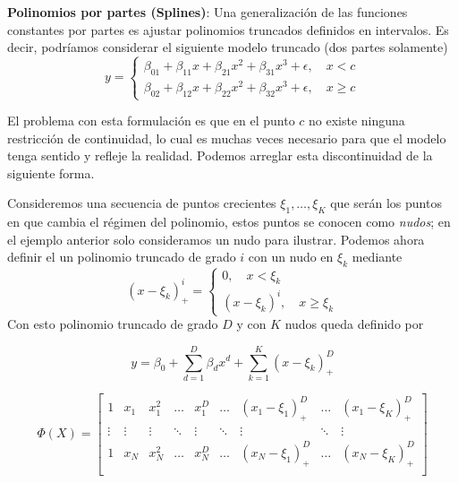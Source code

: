 \iffalse
\noindent\textbf{Polinomios por partes (Splines)}: Una generalización de las funciones constantes por partes es ajustar polinomios truncados definidos en intervalos. Es decir, podríamos considerar el siguiente modelo truncado (dos partes solamente) 
\begin{equation}
    y = \left\{\begin{matrix}
    \beta_{01}+\beta_{11}x+\beta_{21}x^2+\beta_{31}x^3+\epsilon,\quad x < c\\
    \beta_{02}+\beta_{12}x+\beta_{22}x^2+\beta_{32}x^3+\epsilon,\quad x \geq c
    \end{matrix}\right.
\end{equation}
    
El problema con esta formulación es que en el punto $c$ no existe ninguna restricción de continuidad, lo cual es muchas veces necesario para que el modelo tenga sentido y refleje la realidad. Podemos arreglar esta discontinuidad de la siguiente forma.

Consideremos una secuencia de puntos crecientes $\xi_1,\ldots,\xi_K$ que serán los puntos en que cambia el régimen del polinomio, estos puntos se conocen como \emph{nudos}; en el ejemplo anterior solo consideramos un nudo para ilustrar. Podemos ahora definir el un polinomio truncado de grado $i$ con un nudo en $\xi_k$ mediante
\begin{equation}
    (x-\xi_k)_+^i = \left\{\begin{matrix}
    0,\quad x < \xi_k\\
    (x-\xi_k)^i,\quad x \geq \xi_k
    \end{matrix}\right.
\end{equation}
Con esto polinomio truncado de grado $D$ y con $K$ nudos queda definido por
    
    \begin{equation}
        y = \beta_0 + \sum_{d=1}^D\beta_dx^d+\sum_{k=1}^K(x-\xi_k)_+^D
    \end{equation}
    
    \begin{equation}
        \Phi(X) = \left[ \begin{matrix} 1 & x_1 & x_1^2 & \ldots & x_1^D & \ldots & (x_1-\xi_1)_+^D & \ldots & (x_1-\xi_K)_+^D \\
        \vdots & \vdots & \vdots & \ddots & \vdots & \ddots & \vdots & \ddots & \vdots\\
        1 & x_N & x_N^2 & \ldots & x_N^D & \ldots & (x_N-\xi_1)_+^D & \ldots & (x_N-\xi_K)_+^D \\
        \end{matrix} \right]
    \end{equation}

